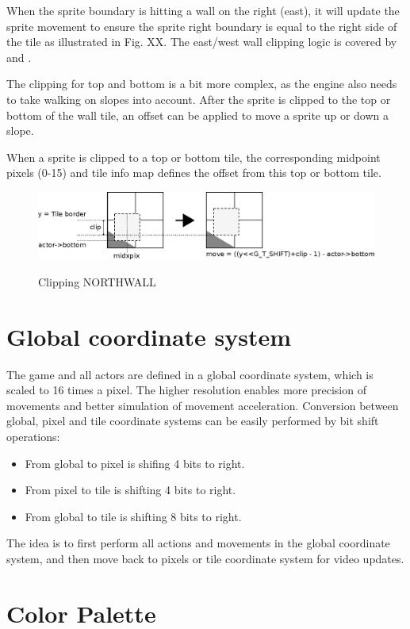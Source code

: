 \documentclass[book.tex]{subfiles}
\begin{document}
\par
When the sprite boundary is hitting a wall on the right (east), it will update the sprite movement to ensure the sprite right boundary is equal to the right side of the tile as illustrated in Fig. XX. The east/west wall clipping logic is covered by  and . 
\\
\begin{minipage}{\textwidth}
  
\end{minipage}
\label{wallclip_array}
\par
The clipping for top and bottom is a bit more complex, as the engine also needs to take walking on slopes into account. After the sprite is clipped to the top or bottom of the wall tile, an offset can be applied to move a sprite up or down a slope. 
\\
\begin{minipage}{\textwidth}
  
\end{minipage}
\label{wallclip_array}
\par
When a sprite is clipped to a top or bottom tile, the corresponding midpoint pixels (0-15) and tile info map defines the offset from this top or bottom tile.
\begin{figure}[H]
  \centering
  \includegraphics[width=\textwidth]{imgs/drawings/clipping.eps}
  \label{fig:clipping_north}
  \caption{Clipping NORTHWALL}
\end{figure}

\par
\begin{minipage}{\textwidth}
  
\end{minipage}
\label{wallclip_array}
\par

\section{Global coordinate system}
The game and all actors are defined in a global coordinate system, which is scaled to 16 times a pixel. The higher resolution enables more precision of movements and better simulation of movement acceleration. Conversion between global, pixel and tile coordinate systems can be easily performed by bit shift operations:
\begin{itemize}
\item From global to pixel is shifing 4 bits to right.
\item From pixel to tile is shifting 4 bits to right.
\item From global to tile is shifting 8 bits to right.
\end{itemize}

The idea is to first perform all actions and movements in the global coordinate system, and then move back to pixels or tile coordinate system for video updates.

\section{Color Palette}
\end{document}
